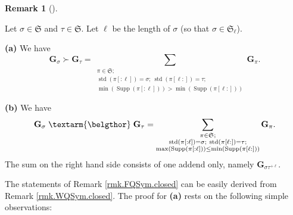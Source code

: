 \documentclass
[numbers=enddot,12pt,final,onecolumn,notitlepage,abstracton]{scrartcl}%
\theoremstyle{definition}
\newtheorem{remk}[theo]{Remark}
\newenvironment{remark}[1][]
{\begin{remk}[#1]\begin{leftbar}}
{\end{leftbar}\end{remk}}
\newcommand{\bel}{\left. \textarm{\belgthor} \right.}
\let\sumnonlimits\sum
\renewcommand{\sum}{\sumnonlimits\limits}
\begin{document}
\begin{remark}
\label{rmk.FQSym.closed}Let $\sigma\in\mathfrak{S}$ and $\tau\in\mathfrak{S}$.
Let $\ell$ be the length of $\sigma$ (so that $\sigma\in\mathfrak{S}_{\ell}$).

\textbf{(a)} We have%
\[
\mathbf{G}_{\sigma}\left.  \succ\right.  \mathbf{G}_{\tau}=\sum_{\substack{\pi
\in\mathfrak{S};\\\operatorname*{std}\left(  \pi\left[  :\ell\right]  \right)
=\sigma;\ \operatorname*{std}\left(  \pi\left[  \ell:\right]  \right)
=\tau;\\\min\left(  \operatorname*{Supp}\left(  \pi\left[  :\ell\right]
\right)  \right)  >\min\left(  \operatorname*{Supp}\left(  \pi\left[
\ell:\right]  \right)  \right)  }}\mathbf{G}_{\pi}.
\]


\textbf{(b)} We have%
\[
\mathbf{G}_{\sigma} \bel \mathbf{G}_{\tau}=\sum_{\substack{\pi\in
\mathfrak{S};\\\operatorname*{std}\left(  \pi\left[  :\ell\right]  \right)
=\sigma;\ \operatorname*{std}\left(  \pi\left[  \ell:\right]  \right)
=\tau;\\\max\left(  \operatorname*{Supp}\left(  \pi\left[  :\ell\right]
\right)  \right)  \leq\min\left(  \operatorname*{Supp}\left(  \pi\left[
\ell:\right]  \right)  \right)  }}\mathbf{G}_{\pi}.
\]
The sum on the right hand side consists of one addend only, namely
$\mathbf{G}_{\sigma\tau^{+\ell}}$.
\end{remark}

The statements of Remark \ref{rmk.FQSym.closed} can be easily derived from
Remark \ref{rmk.WQSym.closed}. The proof for \textbf{(a)} rests on the
following simple observations:
\end{document}
